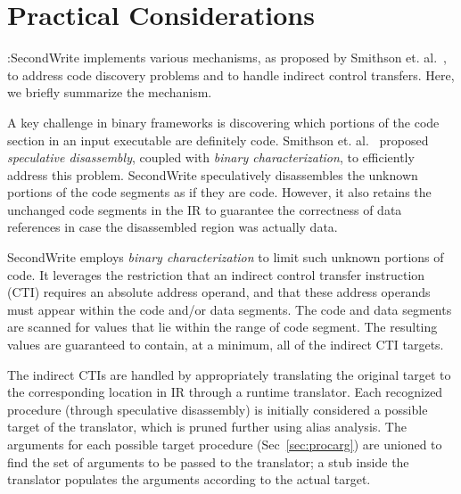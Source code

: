 \section{Practical Considerations}
\label{sec:practicalCons}


:SecondWrite implements various mechanisms, as proposed by Smithson et. al.~\cite{matt-patent10}, to address code discovery problems and to handle indirect control transfers. Here, we briefly summarize the mechanism.

A key challenge in binary frameworks is discovering which portions of the code section in an input executable are definitely code. Smithson et. al.~\cite{matt-patent10} proposed \emph{speculative disassembly}, coupled with \emph{binary characterization}, to efficiently address this problem. SecondWrite speculatively disassembles the unknown portions of the code segments as if they are code. However, it also retains the unchanged code segments in the IR to guarantee the correctness of data references in case the disassembled region was actually data. 

SecondWrite employs \emph{binary characterization} to limit such unknown portions of code. It leverages the restriction that an indirect control transfer instruction (CTI) requires an absolute address operand, and that these address operands must appear within the code and/or data segments. The code and data segments are scanned for values that lie within the range of code segment. The resulting values are guaranteed to contain, at a minimum, all of the indirect CTI targets. 

The indirect CTIs are handled by appropriately translating the original target to the corresponding location in IR through a runtime translator. Each recognized procedure (through speculative disassembly) is initially considered a possible target of the translator, which is pruned further using alias analysis. The arguments for each possible target procedure (Sec~\ref{sec:procarg}) are unioned to find the set of arguments to be passed to the translator; a stub inside the translator populates the arguments according to the actual target.


